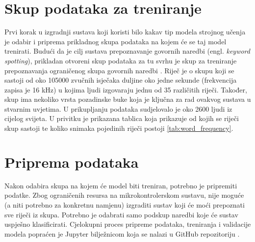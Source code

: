 \section{Skup podataka za treniranje}
\label{sec:dataset}

Prvi korak u izgradnji sustava koji koristi bilo kakav tip modela strojnog učenja
je odabir i priprema prikladnog skupa podataka na kojem će se taj model trenirati.
Budući da je cilj sustava prepoznavanje govornih naredbi (engl. \textit{keyword spotting}),
prikladan otvoreni skup podataka za tu svrhu je skup za treniranje prepoznavanja ograničenog
skupa govornih naredbi \cite{speechcommandsv2}. Riječ je o skupu koji
se sastoji od oko 105000 zvučnih isječaka duljine oko jedne sekunde (frekvencija
zapisa je 16 kHz) u kojima ljudi
izgovaraju jednu od 35 različitih riječi. Također, skup ima nekoliko vrsta 
pozadinske buke koja je ključna za rad ovakvog sustava u stvarnim uvjetima. 
U prikupljanju podataka sudjelovalo je oko 2600 ljudi iz cijelog svijeta.
U privitku je prikazana tablica koja prikazuje od kojih se riječi skup sastoji
te koliko snimaka pojedinih riječi postoji \ref{tab:word_frequency}.


\section{Priprema podataka}
\label{sec:data}

Nakon odabira skupa na kojem će model biti treniran, potrebno je pripremiti
podatke. Zbog ograničenih resursa na mikrokontrolerskom sustavu, nije moguće
(a niti potrebno za konkretnu namjenu) izgraditi sustav koji će moći
prepoznati sve riječi iz skupa. Potrebno je odabrati samo podskup
naredbi koje će sustav uspješno klasificirati. Cjelokupni
proces pripreme podataka, treniranja i validacije modela popraćen je
Jupyter bilježnicom koja se nalazi u GitHub repozitoriju
\cite{balic_keyword_spotting}.

